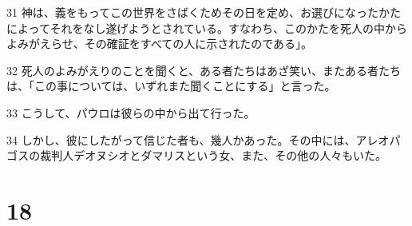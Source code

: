 \par 31 神は、義をもってこの世界をさばくためその日を定め、お選びになったかたによってそれをなし遂げようとされている。すなわち、このかたを死人の中からよみがえらせ、その確証をすべての人に示されたのである」。
\par 32 死人のよみがえりのことを聞くと、ある者たちはあざ笑い、またある者たちは、「この事については、いずれまた聞くことにする」と言った。
\par 33 こうして、パウロは彼らの中から出て行った。
\par 34 しかし、彼にしたがって信じた者も、幾人かあった。その中には、アレオパゴスの裁判人デオヌシオとダマリスという女、また、その他の人々もいた。

\chapter{18}

